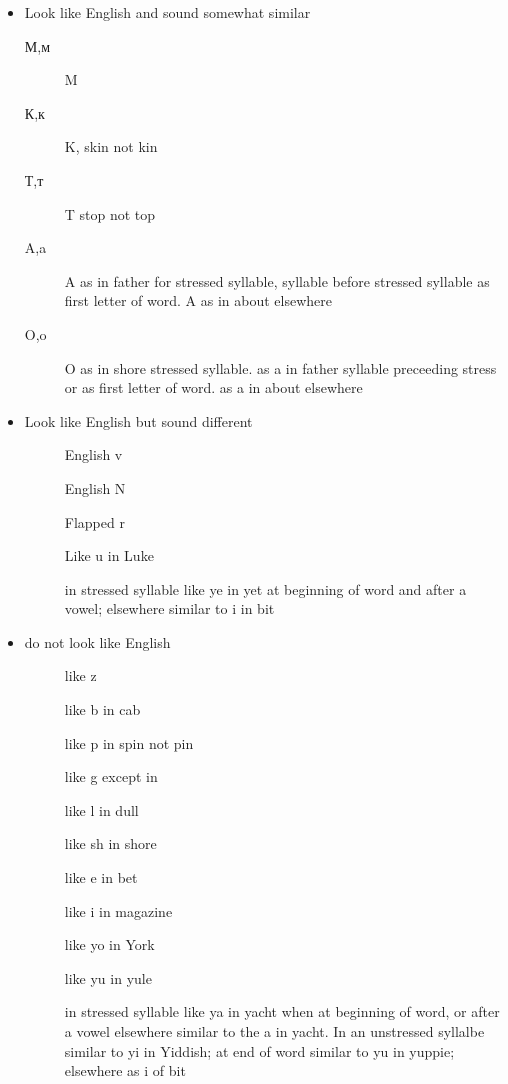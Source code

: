 \documentclass{article}
\begin{document}
\begin{itemize}
\item  Look like English and sound somewhat similar\ 

\begin{description}
\item[М,м] M
\item[К,к] K, skin not kin
\item[Т,т] T stop not top
\item[A,a] A as in father for stressed syllable, syllable before stressed syllable as first letter of word.  A as in about elsewhere
\item[O,o] O as in shore stressed syllable. as a in father syllable preceeding stress or as first letter of word. as a in about elsewhere
\end{description}

\item Look like English but sound different \ 
  \begin{description}
  \item[] English v
    \item[] English N
    \item[] Flapped r
    \item[] Like u in Luke
    \item[] in stressed syllable like ye in yet  at beginning of word and after a vowel; elsewhere similar to i in bit
  \end{description}

\item do not look like English \ 

  \begin{description}
  \item[] like z
  \item[] like b in cab
  \item[] like p in spin not pin
  \item[] like g except in 
  \item[] like l in dull
  \item[] like sh in shore
  \item[] like e in bet
  \item[] like i in magazine
  \item[] like yo in York
  \item[] like yu in yule
  \item[] in stressed syllable like ya in yacht when at beginning of word, or after a vowel elsewhere similar to the a in yacht. In an unstressed syllalbe similar to yi in Yiddish; at end of word similar to yu in yuppie; elsewhere as i of bit
  \end{description}

\end{itemize}


\end{document}
